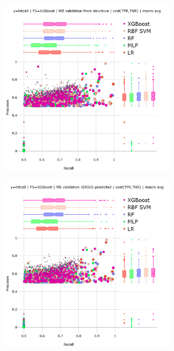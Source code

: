 \begin{figure}[htbp]
  \centering
  \begin{subfigure}[b]{0.495\textwidth}
      \centering
      \includegraphics[width=\textwidth]{generated_results/hitcall_classification_Feature_Selection_XGBClassifier_mb_val_structure_optimal_macro_avg.png}
      \caption{}
  \label{fig:hitcall_classification_Feature_Selection_XGBClassifier_mb_val_structure_optimal_macro_avg}
  \end{subfigure}
  \hfill
  \begin{subfigure}[b]{0.495\textwidth}
      \centering
      \includegraphics[width=\textwidth]{generated_results/hitcall_classification_Feature_Selection_XGBClassifier_mb_val_sirius_optimal_macro_avg.png}

\end{subfigure}
\end{figure}
